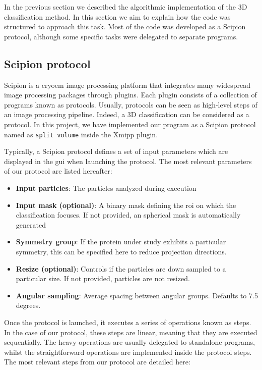 \documentclass[../main.tex]{subfiles}
\begin{document}
In the previous section we described the algorithmic implementation of the 3D classification method. In this section we aim to explain how the code was structured to approach this task. Most of the code was developed as a Scipion protocol, although some specific tasks were delegated to separate programs.

\subsection{Scipion protocol}
Scipion is a \gls{cryoem} image processing platform that integrates many widespread image processing packages through plugins. Each plugin consists of a collection of programs known as protocols. Usually, protocols can be seen as high-level steps of an image processing pipeline. Indeed, a 3D classification can be considered as a protocol. In this project, we have implemented our program as a Scipion protocol named as \texttt{split volume} inside the Xmipp plugin. 

Typically, a Scipion protocol defines a set of input parameters which are displayed in the \gls{gui} when launching the protocol. The most relevant parameters of our protocol are listed hereafter:

\begin{itemize}
    \item \textbf{Input particles}: The particles analyzed during execution
    \item \textbf{Input mask (optional)}: A binary mask defining the \gls{roi} on which the classification focuses. If not provided, an spherical mask is automatically generated
    \item \textbf{Symmetry group}: If the protein under study exhibits a particular symmetry, this can be specified here to reduce projection directions.
    \item \textbf{Resize (optional)}: Controls if the particles are down sampled to a particular size. If not provided, particles are not resized.
    \item \textbf{Angular sampling}: Average spacing between angular groups. Defaults to 7.5 degrees.
\end{itemize}

Once the protocol is launched, it executes a series of operations known as steps. In the case of our protocol, these steps are linear, meaning that they are executed sequentially. The heavy operations are usually delegated to standalone programs, whilst the straightforward operations are implemented inside the protocol steps. The most relevant steps from our protocol are detailed here:
\end{document}
